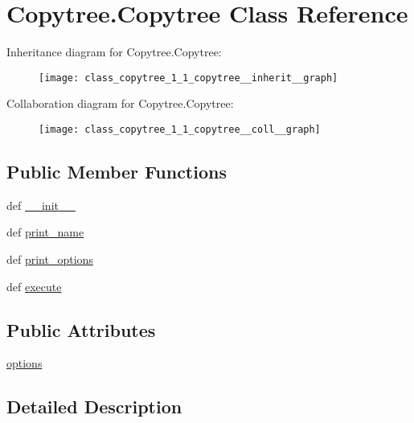 \hypertarget{class_copytree_1_1_copytree}{\section{Copytree.\-Copytree Class Reference}
\label{class_copytree_1_1_copytree}
}


Inheritance diagram for Copytree.\-Copytree\-:
\nopagebreak
\begin{figure}[H]
\begin{center}
\leavevmode
\texttt{[image: class\_copytree\_1\_1\_copytree\_\_inherit\_\_graph]}
\end{center}
\end{figure}


Collaboration diagram for Copytree.\-Copytree\-:
\nopagebreak
\begin{figure}[H]
\begin{center}
\leavevmode
\texttt{[image: class\_copytree\_1\_1\_copytree\_\_coll\_\_graph]}
\end{center}
\end{figure}
\subsection*{Public Member Functions}
\begin{DoxyCompactItemize}
\item 
def \hyperlink{class_copytree_1_1_copytree_a7dc4242e406f7418ca7e4f0c31b8c524}{\-\_\-\-\_\-init\-\_\-\-\_\-}
\item 
def \hyperlink{class_copytree_1_1_copytree_ae6dbc27735bd3bdcb0113564c50b1c1c}{print\-\_\-name}
\item 
def \hyperlink{class_copytree_1_1_copytree_a34bbcd07e83438b9ec9855065b13a397}{print\-\_\-options}
\item 
def \hyperlink{class_copytree_1_1_copytree_a567584587407c9c6027bd7026e36a366}{execute}
\end{DoxyCompactItemize}
\subsection*{Public Attributes}
\begin{DoxyCompactItemize}
\item 
\hyperlink{class_copytree_1_1_copytree_ab12d2712ffd4aba7ddd4c5ceadec153b}{options}
\end{DoxyCompactItemize}


\subsection{Detailed Description}


